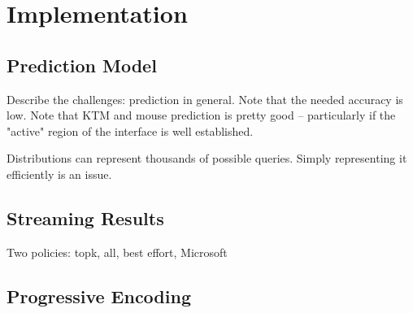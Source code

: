 \section{Implementation}


\subsection{Prediction Model}

Describe the challenges: prediction in general.  Note that the needed accuracy is low.  Note that KTM and mouse prediction is pretty good -- particularly if the "active" region of the interface is well established.


Distributions can represent thousands of possible queries.  Simply representing it efficiently is an issue.

\subsection{Streaming Results}

Two policies: topk, all, best effort, Microsoft


\subsection{Progressive Encoding}


